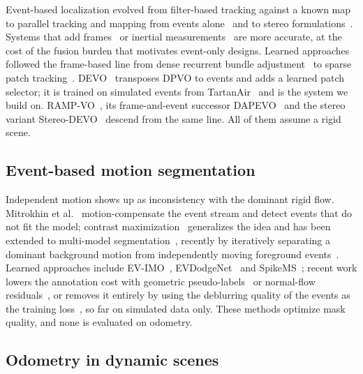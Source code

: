 \documentclass[conference]{IEEEtran}
\begin{document}
Event-based localization evolved from filter-based tracking against a known
map~\cite{weikersdorfer2014slam} to parallel tracking and mapping from events
alone~\cite{rebecq2017evo} and to stereo formulations~\cite{zhou2021esvo,niu2024esvo2}.
Systems that add frames~\cite{hidalgo2022eds,zuo2022devo} or inertial
measurements~\cite{guan2023plevio} are more accurate, at the cost of the fusion burden that
motivates event-only designs. Learned approaches followed the frame-based line from dense
recurrent bundle adjustment~\cite{teed2021droidslam} to sparse patch
tracking~\cite{teed2023dpvo}. DEVO~\cite{klenk2024devo} transposes DPVO to events and adds a
learned patch selector; it is trained on simulated events from
TartanAir~\cite{wang2020tartanair,rebecq2018esim} and is the system we build on.
RAMP-VO~\cite{pellerito2024rampvo}, its frame-and-event successor
DAPEVO~\cite{gandolfi2026dapevo} and the stereo variant
Stereo-DEVO~\cite{zhong2025stereodevo} descend from the same line. All of them assume a
rigid scene.

\subsection{Event-based motion segmentation}

Independent motion shows up as inconsistency with the dominant rigid flow. Mitrokhin et
al.~\cite{mitrokhin2018tracking} motion-compensate the event stream and detect events that
do not fit the model; contrast maximization~\cite{gallego2018cmax} generalizes the idea and
has been extended to multi-model
segmentation~\cite{stoffregen2019motionseg,zhou2021emsgc}, recently by iteratively
separating a dominant background motion from independently moving foreground
events~\cite{yamaki2025iterative}. Learned approaches include
EV-IMO~\cite{mitrokhin2019evimo}, EVDodgeNet~\cite{sanket2020evdodgenet} and
SpikeMS~\cite{parameshwara2021spikems}; recent work lowers the annotation cost with
geometric pseudo-labels~\cite{wang2023unevimo} or normal-flow
residuals~\cite{hua2025normalflow}, or removes it entirely by using the deblurring quality
of the events as the training loss~\cite{farah2025evlayersegnet}, so far on simulated data
only. These methods optimize mask quality, and none is evaluated on odometry.

\subsection{Odometry in dynamic scenes}
\end{document}
